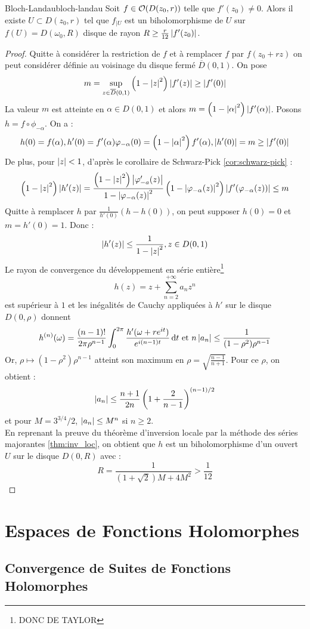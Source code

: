 \documentclass{cours}
\begin{document}
\begin{théorème}{Bloch-Landau}{bloch-landau}
    Soit $f \in \mathcal{O}(D(z_{0}, r))$ telle que $f'(z_{0}) \neq 0$. Alors il existe $U \subset D(z_{0}, r)$ tel que $f_{\mid U}$ est un biholomorphisme de $U$ sur $f(U) = D(\omega_{0}, R)$ disque de rayon $R \geq \frac{r}{12}\left|f'(z_{0})\right|$.
\end{théorème}
\begin{proof}
    Quitte à considérer la restriction de $f$ et à remplacer $f$ par $f(z_{0} + rz)$ on peut considérer définie au voisinage du disque fermé $\overline{D}(0, 1)$. On pose
    \[
        m = \sup_{z \in \overline{D}(0, 1)}\left(1 - \left|z\right|^{2}\right)\left|f'(z)\right| \geq \left|f'(0)\right|
    \]
    La valeur $m$ est atteinte en $\alpha \in D(0, 1)$ et alors $m = \left(1 - \left|\alpha\right|^{2}\right)\left|f'(\alpha)\right|$. Posons $h = f\circ\phi_{-\alpha}$. On a : 
    \[
        h(0) = f(\alpha), h'(0) = f'(\alpha)\varphi_{-\alpha}(0) = \left(1 - \left|\alpha\right|^{2}\right)f'(\alpha), \left|h'(0)\right| = m \geq \left|f'(0)\right|
    \]
    De plus, pour $\left|z\right| < 1$, d'après le corollaire de Schwarz-Pick \ref{cor:schwarz-pick} : 
    \[
        \left(1-\left|z\right|^{2}\right)\left|h'(z)\right| = \frac{\left(1 - \left|z\right|^{2}\right)\left|\varphi_{-a}'(z)\right|}{1 - \left|\varphi_{-\alpha}(z)\right|^{2}}\left(1 - \left|\varphi_{-\alpha}(z)\right|^{2}\right)\left|f'(\varphi_{-\alpha}(z))\right| \leq m
    \]
    Quitte à remplacer $h$ par $\frac{1}{h'(0)}(h-h(0))$, on peut supposer $h(0) = 0$ et $m = h'(0) = 1$. Donc : 
    \[
        \left|h'(z)\right| \leq \frac{1}{1 - \left|z\right|^{2}}, z \in D(0, 1)
    \]
    Le rayon de convergence du développement en série entière\footnote{DONC DE TAYLOR}
    \[
        h(z) = z + \sum_{n = 2}^{+ \infty}a_{n}z^{n}
    \]
    est supérieur à $1$ et les inégalités de Cauchy appliquées à $h'$ sur le disque $D(0, \rho)$ donnent 
    \[
        h^{(n)}(\omega) = \frac{(n- 1)!}{2\pi\rho^{n-1}}\int_{0}^{2\pi}\frac{h'(\omega + re^{it})}{e^{i(n - 1)t}}{\rm \, d} t \text{ et } n\left|a_{n}\right| \leq \frac{1}{(1 - \rho^{2})\rho^{n - 1}}
    \]
    Or, $\rho \mapsto (1 - \rho^{2})\rho^{n - 1}$ atteint son maximum en $\rho = \sqrt{\frac{n-1}{n + 1}}$. Pour ce $\rho$, on obtient : 
    \[
        \left|a_{n}\right| \leq \frac{n + 1}{2n}\left(1 + \frac{2}{n - 1}\right)^{(n-1)/2}
    \]
    et pour $M = 3^{3/4}/2$, $\left|a_{n}\right| \leq M^{n}$ si $n \geq 2$.\\
    En reprenant la preuve du théorème d'inversion locale par la méthode des séries majorantes \ref{thm:inv_loc}, on obtient que $h$ est un biholomorphisme d'un ouvert $U$ sur le disque $D(0, R)$ avec : 
    \[
      R = \frac{1}{\left(1 + \sqrt{2}\right)M + 4M^{2}}>\frac{1}{12}
    \]
\end{proof}

\section{Espaces de Fonctions Holomorphes}
\subsection{Convergence de Suites de Fonctions Holomorphes}
\end{document}
